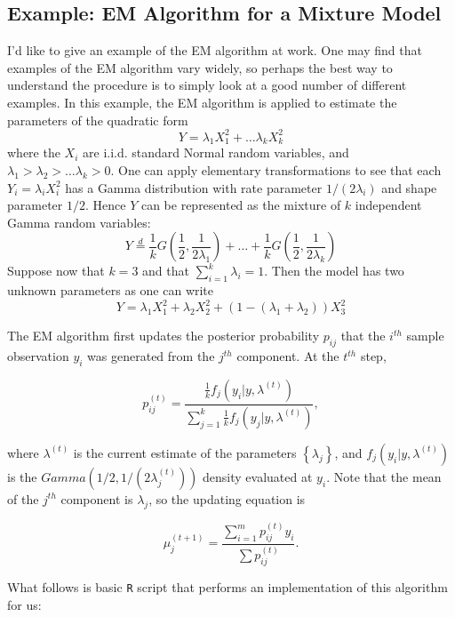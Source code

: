 \documentclass[12pt]{article}
\begin{document}
\begin{flushleft}
\section{Example: EM Algorithm for a Mixture Model}

I'd like to give an example of the EM algorithm at work. One may find that examples of the EM algorithm vary widely, so perhaps the best way to understand the procedure is to simply look at a good number of different examples. In this example, the EM algorithm is applied to estimate the parameters of the quadratic form $$ Y = \lambda_1 X_1^2 + \ldots \lambda_k X_k^2$$ where the $X_i$ are i.i.d. standard Normal random variables, and $\lambda_1 > \lambda_2 > \ldots \lambda_k >0$. One can apply elementary transformations to see that each $Y_i = \lambda_i X_i^2$ has a Gamma distribution with rate parameter $1 / (2 \lambda_i)$ and shape parameter $1/2$. Hence $Y$ can be represented as the mixture of $k$ independent Gamma random variables: $$ Y \stackrel{d}{=} \frac{1}{k} G(\frac{1}{2} , \frac{1}{2\lambda_1} ) + \ldots + \frac{1}{k} G (\frac{1}{2} , \frac{1}{2\lambda_k})$$ Suppose now that $k=3$ and that $\sum_{i=1}^k \lambda_i = 1$. Then the model has two unknown parameters as one can write $$ Y = \lambda_1 X_1^2 + \lambda_2 X_2^2 + (1 - (\lambda_1 +\lambda_2)) X_3^2$$

The EM algorithm first updates the posterior probability $p_{ij}$ that the $i^{th}$ sample observation $y_i$ was generated from the $j^{th}$ component. At the $t^{th}$ step, 

$$ p_{ij}^{(t)} = \frac{\frac{1}{k} f_j (y_i | y , \lambda^{(t)})}{ \sum_{j=1}^k \frac{1}{k} f_j (y_j | y , \lambda^{(t)})},$$

where $\lambda^{(t)}$ is the current estimate of the parameters $\left\{ \lambda_j \right\}$, and $f_j (y_i | y , \lambda^{(t)})$ is the $Gamma(1/2, 1/(2\lambda_j^{(t)}))$ density evaluated at $y_i$. Note that the mean of the $j^{th}$ component is $\lambda_j$, so the updating equation is 

$$ \mu_j^{(t+1)} = \frac{\sum_{i=1}^m p_{ij}^{(t)} y_i}{ \sum p_{ij}^{(t)}}.$$

What follows is basic \texttt{R} script that performs an implementation of this algorithm for us:


\end{flushleft}
\end{document}
